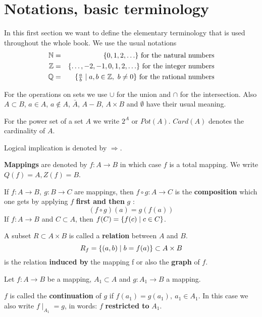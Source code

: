 \section{Notations, basic terminology}

In this first section we want to define the elementary terminology that is used
throughout the whole book. We use the usual notations
\begin{eqnarray*}
\mathbb{N} &=& \mbox{$\{0, 1, 2, \ldots\}$}\text{ for the natural numbers} \\
\mathbb{Z} &=& \mbox{$\{\ldots, -2, -1, 0, 1, 2, \ldots\}$}\text{ for the integer
numbers} \\
\mathbb{Q} &=& \mbox{$\{\frac{a}{b} \mid a,b \in \mathbb{Z},\ b \neq 0\}$}\text{
for the rational numbers}
\end{eqnarray*}

For the operations on sets we use $\cup$ for the union and $\cap$ for the
intersection. Also $A \subset B$, $a \in A$, $a \not\in A$, $\bar{A}$, $A - B$,
$A \times B$ and $\emptyset$ have their usual meaning.

For the power set of a set $A$ we write $2^A$ or $Pot(A)$. $Card(A)$ denotes the
cardinality of $A$.

Logical implication is denoted by $\Rightarrow$.

{\bf Mappings} are denoted by $f : A \to B$ in which case $f$ is a
total mapping. We write $Q(f) = A, Z(f) = B$. 


If $f: A \to B,\ g : B \to C$ are mappings, then $f \circ g : A
\to C$ is the {\bf composition} which one gets by applying
\boldmath $f$ {\bf first and then} $g$ \unboldmath: 
\[(f \circ g)(a) = g(f(a))\]
If $f:A \to B$ and $C \subset A$, then $f(C) = \mbox{$\{f(c) \mid c \in C \}$}$.


A subset $R \subset A \times B$ is called a {\bf relation} between $A$ and $B$.
\[R_f = \mbox{$\{(a,b) \mid b = f(a) \}$} \subset A \times B\] 
is the relation {\bf induced by} the mapping f or also the {\bf graph} of $f$.

Let $f : A \to B$ be a mapping, $A_1 \subset A$ and $g : A_1 \to
B$ a mapping. 

$f$ is called the {\bf continuation} of $g$ if $f(a_1) = g(a_1),\ a_1 \in A_1$.
In this case we also write $f \mid _{A_1} = g$, in words: $f$ {\bf restricted to} $A_1$.

